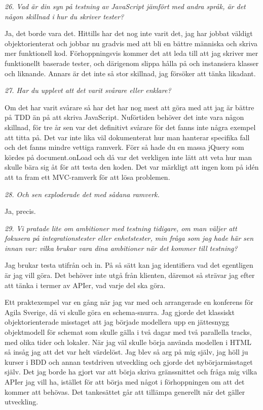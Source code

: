 \documentclass[11pt]{article}
\begin{document}
\emph{26. Vad är din syn på testning av JavaScript jämfört med andra språk, är det någon skillnad i hur du skriver tester?}

Ja, det borde vara det. Hittills har det nog inte varit det, jag har jobbat väldigt objektorienterat och jobbar nu gradvis med att bli en bättre människa och skriva mer funktionell kod. Förhoppningsvis kommer det att leda till att jag skriver mer funktionellt baserade tester, och därigenom slippa hålla på och instansiera klasser och liknande. Annars är det inte så stor skillnad, jag försöker att tänka likadant.

\emph{27. Har du upplevt att det varit svårare eller enklare?}

Om det har varit svårare så har det har nog mest att göra med att jag är bättre på TDD än på att skriva JavaScript. Nuförtiden behöver det inte vara någon skillnad, för tre år sen var det definitivt svårare för det fanns inte några exempel att titta på. Det var inte lika väl dokumenterat hur man hanterar specifika fall och det fanns mindre vettiga ramverk. Förr så hade du en massa jQuery som kördes på document.onLoad och då var det verkligen inte lätt att veta hur man skulle bära sig åt för att testa den koden. Det var märkligt att ingen kom på idén att ta fram ett MVC-ramverk för att lösa problemen.

\emph{28. Och sen exploderade det med sådana ramverk.}

Ja, precis.

\emph{29. Vi pratade lite om ambitioner med testning tidigare, om man väljer att fokusera på integrationstester eller enhetstester, min fråga som jag hade här sen innan var: vilka brukar vara dina ambitioner när det kommer till testning?}

Jag brukar testa utifrån och in. På så sätt kan jag identifiera vad det egentligen är jag vill göra. Det behöver inte utgå från klienten, däremot så strävar jag efter att tänka i termer av APIer, vad varje del ska göra.

Ett praktexempel var en gång när jag var med och arrangerade en konferens för Agila Sverige, då vi skulle göra en schema-snurra. Jag gjorde det klassiskt objektorienterade misstaget att jag började modellera upp en jättesnygg objektmodell för schemat som skulle gälla i två dagar med två parallella tracks, med olika tider och lokaler. När jag väl skulle börja använda modellen i HTML så insåg jag att det var helt värdelöst. Jag blev så arg på mig själv, jag höll ju kurser i BDD och annan testdriven utveckling och gjorde det nybörjarmisstaget själv. Det jag borde ha gjort var att börja skriva gränssnittet och fråga mig vilka APIer jag vill ha, istället för att börja med något i förhoppningen om att det kommer att behövas. Det tankesättet går att tillämpa generellt när det gäller utveckling.
\end{document}
